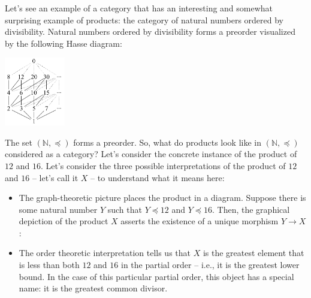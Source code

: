 Let's see an example of a category that has an interesting and somewhat 
surprising example of products: the category of natural numbers 
ordered by divisibility. Natural numbers ordered by divisibility forms 
a preorder visualized by the following Hasse diagram:

\begin{center}
  \includegraphics[width=100px]{fig/divisor_lattice.png}
\end{center}

The set $(\mathbb{N}, \preceq)$ forms a preorder. So,
what do products look like in $(\mathbb{N}, \preceq)$ considered 
as a category?
Let's consider the concrete instance of the product of $12$ 
and $16$. Let's consider the three possible interpretations of 
the product of $12$ and $16$ -- let's call it $X$ -- to understand what it means here:
\begin{itemize}
  \item The graph-theoretic picture places the product in a diagram. 
  Suppose there is some natural number $Y$ such that $Y \preceq 12$ and $Y \preceq 16$.
  Then, the graphical depiction of the product $X$ 
  asserts the existence of a unique morphism $Y \to X$:
\begin{center}
\end{center}

  \item The order theoretic interpretation tells us that 
  $X$ is the greatest element that is less than both $12$
  and $16$ in the partial order -- i.e., it is the 
  greatest lower bound. In the case of this particular 
  partial order, this object has a special name: it is the 
  greatest common divisor.
\end{itemize}

